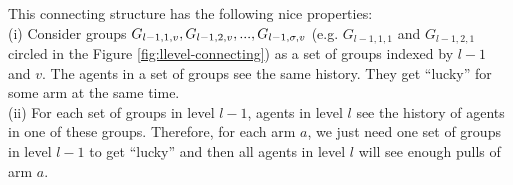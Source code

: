 This connecting structure has the following nice properties: \\
(i) Consider groups $G_{l-1,1,v},G_{l-1,2,v},...,G_{l-1,\sigma,v}$ (e.g. $G_{l-1,1,1}$ and $G_{l-1,2,1}$ circled in the Figure \ref{fig:llevel-connecting}) as a set of groups indexed by $l-1$ and $v$. The agents in a set of groups see the same history. They get ``lucky'' for some arm at the same time.\\
(ii) For each set of groups in level $l-1$, agents in level $l$ see
the history of agents in one of these groups. Therefore, for each arm
$a$, we just need one set of groups in level $l-1$ to get ``lucky''
and then all agents in level $l$ will see enough pulls of arm $a$.

